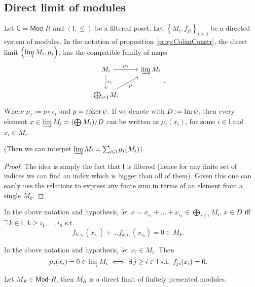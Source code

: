\subsection{Direct limit of modules}
\begin{lem}
	Let $\mathsf{C} = \mathsf{Mod}\text{-}R$ and $\left(\mathsf{I}, \leq\right)$ be a filtered poset.
	Let $\left\{ M_i, f_{ji} \right\}_{i \leq j}$ be a directed system of modules.
	In the notation of proposition \ref{prop:ColimConstr}, the direct limit $\left(\varinjlim M_i, \mu_i\right)$, has the
	compatible family of maps
	\begin{equation}
	\begin{tikzcd}
		M_i \arrow[r, "\mu_i", rightarrow] \arrow[d, "\epsilon_i", rightarrow] &
		\varinjlim M_i \\
		\bigoplus_{i \in \mathsf{I}} M_i \arrow[ru, "p"', rightarrow] &
	\end{tikzcd}
	.\end{equation} 
	Where $\mu_i := p \circ\epsilon_i$ and $p = \operatorname{coker} \psi$.
	If we denote with $D := \operatorname{Im} \psi$, then
	every element $x \in \varinjlim M_i = (\bigoplus M_i)/D$ can be written as
	$\mu_i(x_i)$, for some $i \in \mathsf{I}$ and $x_i \in M_i$.

	(Then we can interpet $\varinjlim M_i = \sum_{i \in \mathsf{I}}^{} \mu_i (M_i)$).
\end{lem} 
\begin{proof}
	The idea is simply the fact that $\mathsf{I}$ is filtered 
	(hence for any finite set of indices we can find an index which is bigger than all of them).
	Given this one can easily use the relations to express any finite sum in terms of an element from a single $M_k$.
\end{proof}

\begin{lem}
	In the above notation and hypothesis, let $x = x_{i_1} + \ldots + x_{i_n} \in \bigoplus_{i \in \mathsf{I}} M_i$.
	$x \in D$ iff $\exists\, k \in \mathsf{I}$, $k \geq i_1, \ldots, i_n$ s.t.
	\begin{equation}
		f_{k, i_1}(x_{i_1}) + \ldots f_{k, i_n}(x_{i_n}) = 0 \in M_k
	.\end{equation} 
\end{lem} 

\begin{lem}
	In the above notation and hypothesis, let $x_i \in M_i$.
	Then 
	\begin{equation}
		\mu_i(x_i) = 0 \in \varinjlim M_i \iff \exists\, j \geq i \in \mathsf{I} \text{ s.t. } f_{ji}(x_i) = 0
	.\end{equation} 
\end{lem} 

\begin{prop}
	Let $M_R \in \mathsf{Mod}\text{-}R$, then $M_R$ is a direct limit of finitely presented modules.
\end{prop} 
